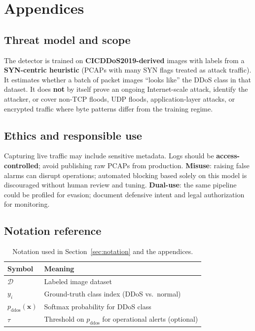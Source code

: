 \chapter{Appendices}

\section{Threat model and scope}
The detector is trained on \textbf{CICDDoS2019-derived} images with labels from a
\textbf{SYN-centric heuristic} (PCAPs with many SYN flags treated as attack
traffic). It estimates whether a batch of packet images ``looks like'' the DDoS
class in that dataset. It does \textbf{not} by itself prove an ongoing
Internet-scale attack, identify the attacker, or cover non-TCP floods, UDP
floods, application-layer attacks, or encrypted traffic where byte patterns
differ from the training regime.

\section{Ethics and responsible use}
Capturing live traffic may include sensitive metadata. Logs should be
\textbf{access-controlled}; avoid publishing raw PCAPs from production.
\textbf{Misuse}: raising false alarms can disrupt operations; automated blocking
based solely on this model is discouraged without human review and tuning.
\textbf{Dual-use}: the same pipeline could be profiled for evasion; document
defensive intent and legal authorization for monitoring.

\section{Notation reference}
\begin{table}[ht]
\centering
\begin{tabular}{|l|l|}
\hline
\textbf{Symbol} & \textbf{Meaning} \\
\hline
$\mathcal{D}$ & Labeled image dataset \\
\hline
$y_i$ & Ground-truth class index (DDoS vs.\ normal) \\
\hline
$p_{\mathrm{ddos}}(\mathbf{x})$ & Softmax probability for DDoS class \\
\hline
$\tau$ & Threshold on $p_{\mathrm{ddos}}$ for operational alerts (optional) \\
\hline
\end{tabular}
\caption[Notation reference]{Notation used in Section~\ref{sec:notation} and the appendices.}
\label{tab:notationlist}
\end{table}

